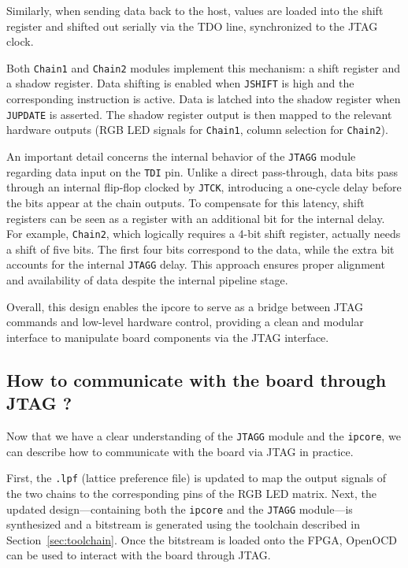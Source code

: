 \documentclass[a4paper,11pt,oneside]{report}
\begin{document}
Similarly, when sending data back to the host, values are loaded into the shift register and shifted out serially via the TDO line, synchronized to the JTAG clock.

Both \texttt{Chain1} and \texttt{Chain2} modules implement this mechanism: a shift register and a shadow register.  
Data shifting is enabled when \texttt{JSHIFT} is high and the corresponding instruction is active.  
Data is latched into the shadow register when \texttt{JUPDATE} is asserted.  
The shadow register output is then mapped to the relevant hardware outputs (RGB LED signals for \texttt{Chain1}, column selection for \texttt{Chain2}).

An important detail concerns the internal behavior of the \texttt{JTAGG} module regarding data input on the \texttt{TDI} pin.  
Unlike a direct pass-through, data bits pass through an internal flip-flop clocked by \texttt{JTCK}, introducing a one-cycle delay before the bits appear at the chain outputs.  
To compensate for this latency, shift registers can be seen as a register with an additional bit for the internal delay.  
For example, \texttt{Chain2}, which logically requires a 4-bit shift register, actually needs a shift of five bits.  
The first four bits correspond to the data, while the extra bit accounts for the internal \texttt{JTAGG} delay.  
This approach ensures proper alignment and availability of data despite the internal pipeline stage.

Overall, this design enables the ipcore to serve as a bridge between JTAG commands and low-level hardware control, providing a clean and modular interface to manipulate board components via the JTAG interface.

\subsection{How to communicate with the board through JTAG ?} 

Now that we have a clear understanding of the \texttt{JTAGG} module and the \texttt{ipcore}, we can describe how to communicate with the board via JTAG in practice.

First, the \texttt{.lpf} (lattice preference file) is updated to map the output signals of the two chains to the corresponding pins of the RGB LED matrix.  
Next, the updated design—containing both the \texttt{ipcore} and the \texttt{JTAGG} module—is synthesized and a bitstream is generated using the toolchain described in Section~\ref{sec:toolchain}.  
Once the bitstream is loaded onto the FPGA, OpenOCD can be used to interact with the board through JTAG.
\end{document}
